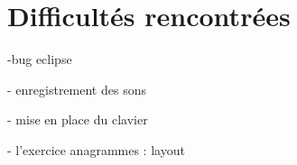 \section{Difficultés rencontrées}
-bug eclipse

- enregistrement des sons

- mise en place du clavier

- l'exercice anagrammes : layout